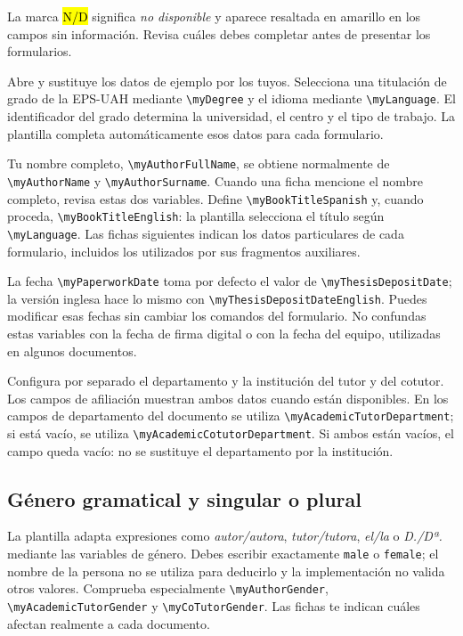 \documentclass[10pt,a4paper]{article}
\newcommand{\variable}[1]{\texttt{\textbackslash{}}\nolinkurl{#1}}
\newcommand{\fichero}[1]{\path{#1}}
\begin{document}
La marca \hl{N/D} significa \emph{no disponible} y aparece resaltada en amarillo en los campos sin información. Revisa cuáles debes completar antes de presentar los formularios.

Abre \fichero{Config/myconfig.tex} y sustituye los datos de ejemplo por los tuyos. Selecciona una titulación de grado de la EPS-UAH mediante \variable{myDegree} y el idioma mediante \variable{myLanguage}. El identificador del grado determina la universidad, el centro y el tipo de trabajo. La plantilla completa automáticamente esos datos para cada formulario.

Tu nombre completo, \variable{myAuthorFullName}, se obtiene normalmente de \variable{myAuthorName} y \variable{myAuthorSurname}. Cuando una ficha mencione el nombre completo, revisa estas dos variables. Define \variable{myBookTitleSpanish} y, cuando proceda, \variable{myBookTitleEnglish}: la plantilla selecciona el título según \variable{myLanguage}. Las fichas siguientes indican los datos particulares de cada formulario, incluidos los utilizados por sus fragmentos auxiliares.

La fecha \variable{myPaperworkDate} toma por defecto el valor de \variable{myThesisDepositDate}; la versión inglesa hace lo mismo con \variable{myThesisDepositDateEnglish}. Puedes modificar esas fechas sin cambiar los comandos del formulario. No confundas estas variables con la fecha de firma digital o con la fecha del equipo, utilizadas en algunos documentos.

Configura por separado el departamento y la institución del tutor y del cotutor. Los campos de afiliación muestran ambos datos cuando están disponibles. En los campos de departamento del documento se utiliza \variable{myAcademicTutorDepartment}; si está vacío, se utiliza \variable{myAcademicCotutorDepartment}. Si ambos están vacíos, el campo queda vacío: no se sustituye el departamento por la institución.

\subsection{Género gramatical y singular o plural}

La plantilla adapta expresiones como \emph{autor/autora}, \emph{tutor/tutora}, \emph{el/la} o \emph{D./Dª.} mediante las variables de género. Debes escribir exactamente \texttt{male} o \texttt{female}; el nombre de la persona no se utiliza para deducirlo y la implementación no valida otros valores. Comprueba especialmente \variable{myAuthorGender}, \variable{myAcademicTutorGender} y \variable{myCoTutorGender}. Las fichas te indican cuáles afectan realmente a cada documento.
\end{document}
